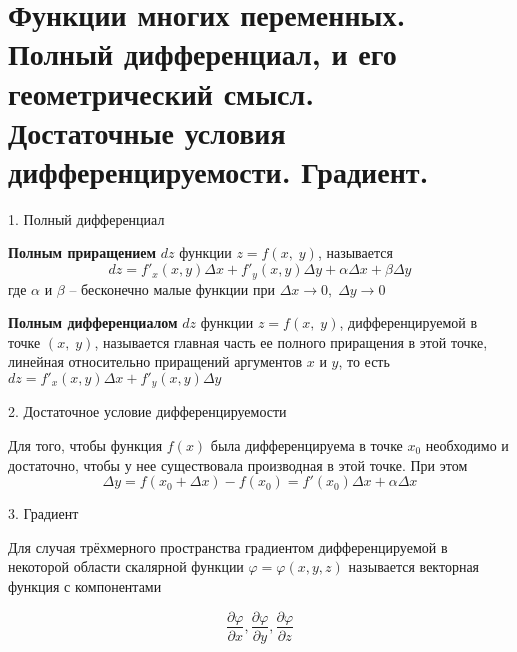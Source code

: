 \section{
	Функции многих переменных. Полный дифференциал, и его геометрический смысл. \\
    Достаточные условия дифференцируемости. Градиент. 
}

1. Полный дифференциал

\textbf{Полным приращением} $dz$ функции $z=f(x,\;y)$, называется 
$$dz=f'_{x}(x, y)\varDelta x + f'_{y}(x,y)\varDelta y + \alpha \varDelta x + \beta \varDelta y$$
где $\alpha$ и $\beta$ – бесконечно малые функции при $\varDelta x \rightarrow 0,\; \varDelta y \rightarrow 0$

\textbf{Полным дифференциалом} $dz$ функции $z=f(x,\;y)$,
дифференцируемой в точке $(x,\;y)$, называется главная часть ее полного
приращения в этой точке, линейная относительно приращений аргументов $x$ и 
$y$, то есть $dz=f'_{x}(x, y)\varDelta  x + f'_{y}(x,y)\varDelta  y$

2. Достаточное условие дифференцируемости

Для того, чтобы функция $f(x)$ была дифференцируема в точке $x_0$ необходимо и достаточно, 
чтобы у нее существовала производная в этой точке. При этом
$$
\varDelta y = f(x_0 + \varDelta x) - f(x_0) = f'(x_0)\varDelta x + \alpha \varDelta x
$$

3. Градиент

Для случая трёхмерного пространства градиентом дифференцируемой в некоторой области скалярной функции 
$\varphi =\varphi (x,y,z)$ называется векторная функция с компонентами

$$
\frac{\partial \varphi }{\partial x},
\frac{\partial \varphi }{\partial y},
\frac{\partial \varphi }{\partial z}
$$